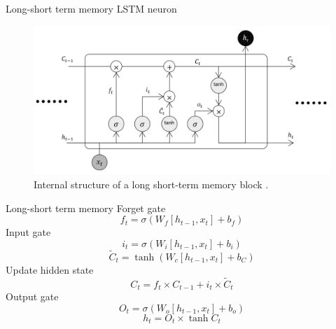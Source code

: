 \documentclass{beamer}
\begin{document}
\begin{frame}{Long-short term memory}
LSTM neuron \cite{hochreiter1997}
  \begin{figure}[H]
  	\centering
  	\includegraphics[width=1\textwidth]{lstm.PNG}
  	\caption{Internal structure of a long short-term memory block \cite{olah}.}
  \end{figure}
\end{frame}

\begin{frame}{Long-short term memory}
  Forget gate
	\[	f_t=\sigma(W_f[h_{t-1},x_t]+b_f) \]
	Input gate
	\[ i_t=\sigma(W_i[h_{t-1},x_t]+b_i) \]
	\[ \tilde{C}_t=\tanh (W_c[h_{t-1},x_t]+b_C) \]
	Update hidden state
	\[ C_t=f_t\times C_{t-1}+i_t\times\tilde{C}_t \]
	Output gate
	\[ O_t=\sigma(W_o[h_{t-1},x_t]+b_o) \]
	\[ h_t=O_t\times\tanh C_t \]
\end{frame}
\end{document}

